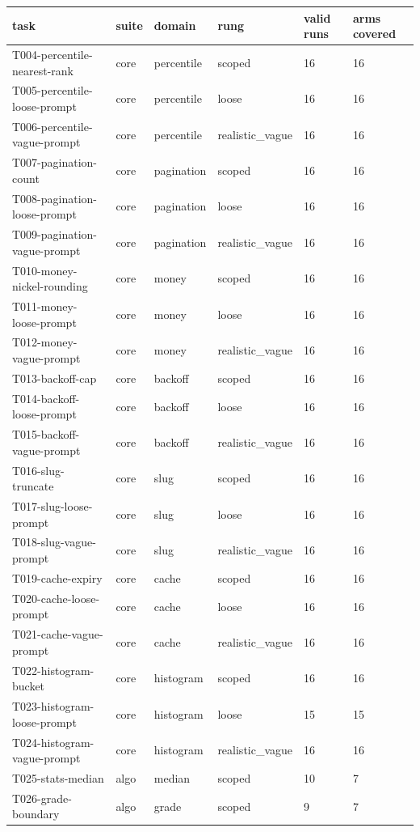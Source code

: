 \begin{tabular}{llllll}
\toprule
task & suite & domain & rung & valid runs & arms covered \\
\midrule
T004-percentile-nearest-rank & core & percentile & scoped & 16 & 16 \\
T005-percentile-loose-prompt & core & percentile & loose & 16 & 16 \\
T006-percentile-vague-prompt & core & percentile & realistic\_vague & 16 & 16 \\
T007-pagination-count & core & pagination & scoped & 16 & 16 \\
T008-pagination-loose-prompt & core & pagination & loose & 16 & 16 \\
T009-pagination-vague-prompt & core & pagination & realistic\_vague & 16 & 16 \\
T010-money-nickel-rounding & core & money & scoped & 16 & 16 \\
T011-money-loose-prompt & core & money & loose & 16 & 16 \\
T012-money-vague-prompt & core & money & realistic\_vague & 16 & 16 \\
T013-backoff-cap & core & backoff & scoped & 16 & 16 \\
T014-backoff-loose-prompt & core & backoff & loose & 16 & 16 \\
T015-backoff-vague-prompt & core & backoff & realistic\_vague & 16 & 16 \\
T016-slug-truncate & core & slug & scoped & 16 & 16 \\
T017-slug-loose-prompt & core & slug & loose & 16 & 16 \\
T018-slug-vague-prompt & core & slug & realistic\_vague & 16 & 16 \\
T019-cache-expiry & core & cache & scoped & 16 & 16 \\
T020-cache-loose-prompt & core & cache & loose & 16 & 16 \\
T021-cache-vague-prompt & core & cache & realistic\_vague & 16 & 16 \\
T022-histogram-bucket & core & histogram & scoped & 16 & 16 \\
T023-histogram-loose-prompt & core & histogram & loose & 15 & 15 \\
T024-histogram-vague-prompt & core & histogram & realistic\_vague & 16 & 16 \\
T025-stats-median & algo & median & scoped & 10 & 7 \\
T026-grade-boundary & algo & grade & scoped & 9 & 7 \\

\end{tabular}
